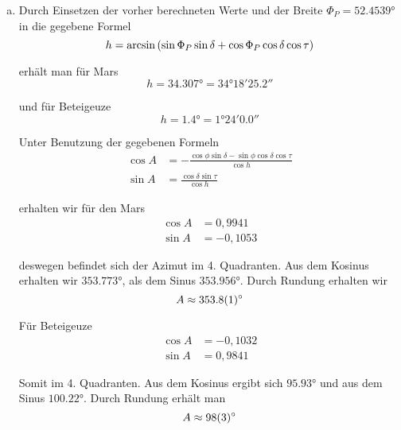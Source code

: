 \documentclass[a4paper,german,12pt,smallheadings]{scrartcl}
\newcommand*{\ra}[2][]{{
  \def\SIUnitSymbolDegree{\textsuperscript{h}}%
  \def\SIUnitSymbolArcminute{\textsuperscript{m}}%
  \def\SIUnitSymbolArcsecond{\textsuperscript{s}}%
  \ang[#1]{#2}}%
}
\begin{document}
\begin{enumerate}[a)]
    Somit ergibt sich für Mars
    \begin{equation}
      \tau = \ra{-0.3334} = \ra{23.6666} = \ra{23;40;0}
    \end{equation}

    Und für Beteigeuze
    \begin{equation}
      \tau = \ra{6.4936} = \ra{6;29;37}
    \end{equation}
  \item
    Durch Einsetzen der vorher berechneten Werte und der Breite $\Phi_P =
    \ang{52.4539}$ in die gegebene Formel
    \begin{equation}
      h = \arcsin \del{\sin \Phi_P \sin \delta + \cos \Phi_P \cos \delta \cos \tau}
    \end{equation}

    erhält man für Mars
    \begin{equation}
      h = \ang{34.307} = \ang{34;18;25.2}
    \end{equation}

    und für Beteigeuze
    \begin{equation}
      h = \ang{1.4} = \ang{1;24;0.0}
    \end{equation}

    Unter Benutzung der gegebenen Formeln
    \begin{align}
      \cos A &= -\frac{\cos \phi \sin \delta - \sin \phi \cos \delta \cos \tau}{\cos h} \\
      \sin A &= \frac{\cos \delta \sin \tau}{\cos h}
    \end{align}

    erhalten wir für den Mars
    \begin{align}
      \cos A &= 0{,}9941 \\
      \sin A &= -0{,}1053
    \end{align}

    deswegen befindet sich der Azimut im 4. Quadranten. Aus dem Kosinus
    erhalten wir $\ang{353.773}$, als dem Sinus $\ang{353.956}$. Durch Rundung
    erhalten wir
    \begin{equation}
      A \approx \ang{353.8+-0.1}
    \end{equation}

    Für Beteigeuze
    \begin{align}
      \cos A &= -0{,}1032 \\
      \sin A &= 0{,}9841
    \end{align}

    Somit im 4. Quadranten. Aus dem Kosinus ergibt sich $\ang{95.93}$ und aus
    dem Sinus $\ang{100.22}$. Durch Rundung erhält man
    \begin{equation}
      A \approx \ang{98+-3}
    \end{equation}



\end{enumerate}
\end{document}
